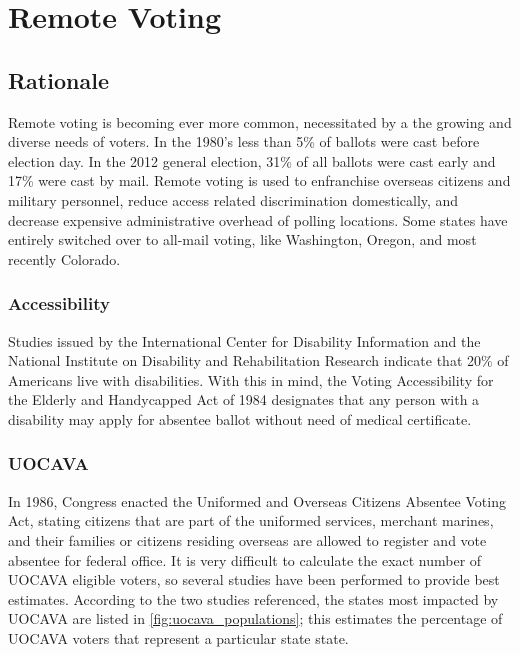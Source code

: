 \chapter{Remote Voting}
\label{chapter:remote_voting}

\section{Rationale}
Remote voting is becoming ever more common, necessitated by a the growing and
diverse needs of voters. In the 1980's less than 5\% of ballots were cast
before election day. In the 2012 general election, 31\% of all ballots were
cast early and 17\% were cast by mail. Remote voting is used to enfranchise
overseas citizens and military personnel, reduce access related discrimination
domestically, and decrease expensive administrative overhead of polling
locations. Some states have entirely switched over to all-mail voting, like
Washington, Oregon, and most recently Colorado.

\subsection{Accessibility}
Studies issued by the International Center for Disability Information and the
National Institute on Disability and Rehabilitation Research indicate that 20\%
of Americans live with disabilities. With this in mind, the Voting
Accessibility for the Elderly and Handycapped Act of 1984 designates that any
person with a disability may apply for absentee ballot without need of medical
certificate.


\subsection{UOCAVA}
In 1986, Congress enacted the Uniformed and Overseas Citizens Absentee Voting
Act, stating citizens that are part of the uniformed services, merchant
marines, and their families or citizens residing overseas are allowed to
register and vote absentee for federal office. It is very difficult to
calculate the exact number of UOCAVA eligible voters, so several studies have
been performed to provide best estimates. According to the two studies
referenced, the states most impacted by UOCAVA are listed in
\autoref{fig:uocava_populations}; this estimates the percentage of UOCAVA
voters that represent a particular state state.

